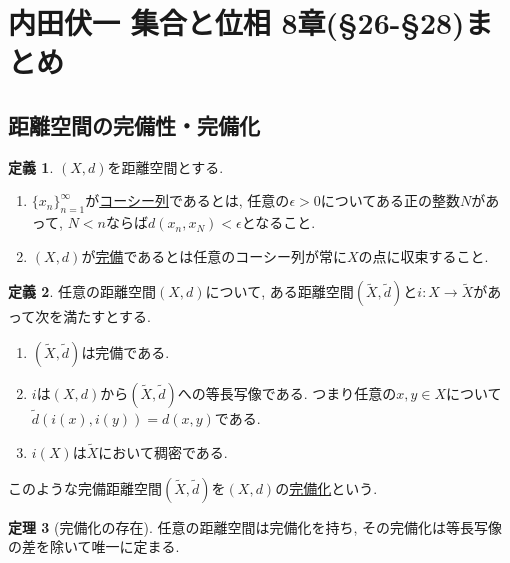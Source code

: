 \documentclass[dvipdfmx,a4paper,11pt]{article}
\theoremstyle{definition}
\newtheorem{thm}{定理}
\newtheorem{dfn}[thm]{定義}
\begin{document}
\newpage
\section{内田伏一 集合と位相 8章(\S26-\S28)まとめ}

\subsection{距離空間の完備性・完備化}
 \begin{tcolorbox}[
    colback = white,
    colframe = green!35!black,
    fonttitle = \bfseries,
    breakable = true]
    \begin{dfn}
$(X,d)$を距離空間とする.
\begin{enumerate}
	\item $\{ x_n\}_{n=1}^{\infty}$が\underline{コーシー列}であるとは, 任意の$\epsilon>0$についてある正の整数$N$があって, $N < n$ならば$d(x_n,x_N)<\epsilon$となること.
	\item $(X,d)$が\underline{完備}であるとは任意のコーシー列が常に$X$の点に収束すること.
\end{enumerate}
  \end{dfn}
\end{tcolorbox}

 \begin{tcolorbox}[
    colback = white,
    colframe = green!35!black,
    fonttitle = \bfseries,
    breakable = true]
    \begin{dfn}
任意の距離空間$(X,d)$について, ある距離空間$(\tilde{X},\tilde{d})$と$i : X \rightarrow \tilde{X}$があって次を満たすとする.
\begin{enumerate}
 \setlength{\parskip}{0cm} 
  \setlength{\itemsep}{0cm} 
\item $(\tilde{X},\tilde{d})$は完備である.
\item $i$は$(X,d)$から$(\tilde{X},\tilde{d})$への等長写像である. つまり任意の$x,y \in X$について$\tilde{d}(i(x),i(y))=d(x,y)$である.
\item $i(X)$は$\tilde{X}$において稠密である.
\end{enumerate}
このような完備距離空間$(\tilde{X},\tilde{d})$を$(X,d)$の\underline{完備化}という.
  \end{dfn}
\end{tcolorbox}

 \begin{tcolorbox}[
    colback = white,
    colframe = green!35!black,
    fonttitle = \bfseries,
    breakable = true]
    \begin{thm}[完備化の存在]
任意の距離空間は完備化を持ち, その完備化は等長写像の差を除いて唯一に定まる.
  \end{thm}
\end{tcolorbox}
\end{document}
